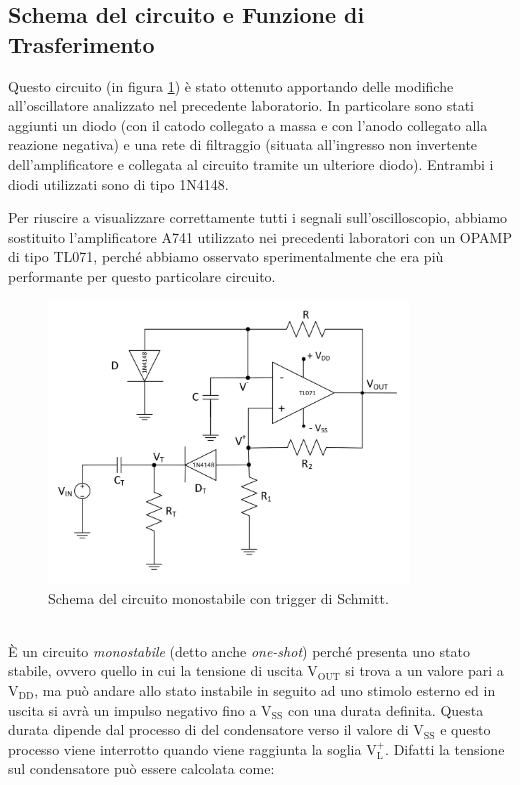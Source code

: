 \documentclass{report}
\begin{document}
\subsection{Schema del circuito e Funzione di Trasferimento}
Questo circuito (in figura \ref{figura:schema1}) è stato ottenuto apportando delle modifiche all'oscillatore analizzato nel precedente laboratorio. In particolare sono stati aggiunti un diodo (con il catodo collegato a massa e con l'anodo collegato alla reazione negativa) e una rete di filtraggio (situata all'ingresso non invertente dell'amplificatore e collegata al circuito tramite un ulteriore diodo). Entrambi i diodi utilizzati sono di tipo 1N4148.\par
Per riuscire a visualizzare correttamente tutti i segnali sull'oscilloscopio, abbiamo sostituito l'amplificatore \textmu A741 utilizzato nei precedenti laboratori con un OPAMP di tipo TL071, perché abbiamo osservato sperimentalmente che era più performante per questo particolare circuito.
\begin{figure}[h!]
	\centering
	\includegraphics[height=7.5cm]{immagini/schema1}
	\caption{Schema del circuito monostabile con trigger di Schmitt.}
	\label{figura:schema1}
\end{figure}
\\\` E un circuito \textit{monostabile} (detto anche \textit{one-shot}) perché presenta uno stato stabile, ovvero quello in cui la tensione di uscita $\displaystyle\mathrm{V_{OUT}}$ si trova a un valore pari a $\displaystyle\mathrm{V_{DD}}$, ma può andare allo stato instabile in seguito ad uno stimolo esterno ed in uscita si avrà un impulso negativo fino a $\displaystyle\mathrm{V_{SS}}$ con una durata definita.  Questa durata dipende dal processo di  del condensatore verso il valore di $\displaystyle\mathrm{V_{SS}}$ e questo processo viene interrotto quando viene raggiunta la soglia $\displaystyle\mathrm{V_L^+}$. Difatti la tensione sul condensatore può essere calcolata come:
\end{document}
